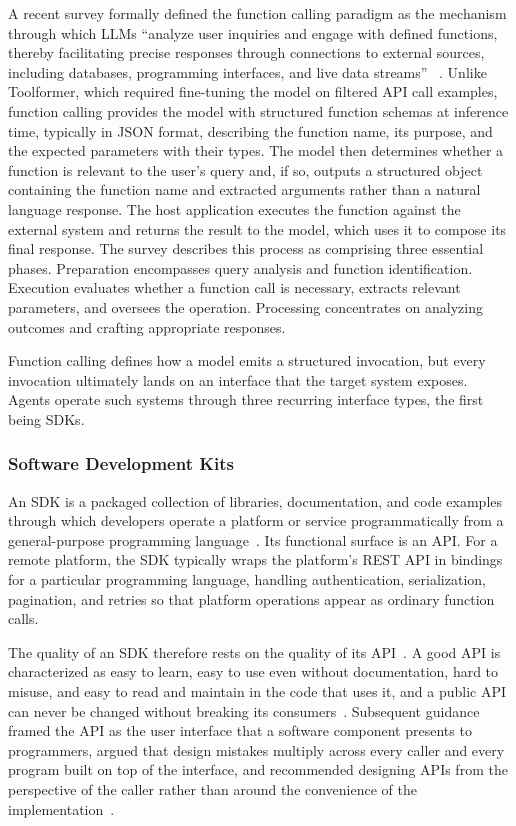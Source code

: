 \documentclass[
english,                 %
bibtex,                  %
]{kththesis}
\numberwithin{listing}{chapter}
\begin{document}
A recent survey formally defined the function calling paradigm as the mechanism through which \glspl{LLM} ``analyze user inquiries and engage with defined functions, thereby facilitating precise responses through connections to external sources, including databases, programming interfaces, and live data streams'' ~\cite{wang_function_2026}. Unlike Toolformer, which required fine-tuning the model on filtered \gls{API} call examples, function calling provides the model with structured function schemas at inference time, typically in \gls{JSON} format, describing the function name, its purpose, and the expected parameters with their types. The model then determines whether a function is relevant to the user's query and, if so, outputs a structured object containing the function name and extracted arguments rather than a natural language response. The host application executes the function against the external system and returns the result to the model, which uses it to compose its final response. The survey describes this process as comprising three essential phases. Preparation encompasses query analysis and function identification. Execution evaluates whether a function call is necessary, extracts relevant parameters, and oversees the operation. Processing concentrates on analyzing outcomes and crafting appropriate responses.

Function calling defines how a model emits a structured invocation, but every invocation ultimately lands on an interface that the target system exposes. Agents operate such systems through three recurring interface types, the first being \glspl{SDK}.

\subsubsection{Software Development Kits}
\label{sec:bg_software_development_kit}

An \gls{SDK} is a packaged collection of libraries, documentation, and code examples through which developers operate a platform or service programmatically from a general-purpose programming language~\cite{bloch_how_2006}. Its functional surface is an \gls{API}. For a remote platform, the \gls{SDK} typically wraps the platform's \gls{REST} \gls{API} in bindings for a particular programming language, handling authentication, serialization, pagination, and retries so that platform operations appear as ordinary function calls.

The quality of an \gls{SDK} therefore rests on the quality of its \gls{API}~\cite{bloch_how_2006}. A good \gls{API} is characterized as easy to learn, easy to use even without documentation, hard to misuse, and easy to read and maintain in the code that uses it, and a public \gls{API} can never be changed without breaking its consumers~\cite{bloch_how_2006}. Subsequent guidance framed the \gls{API} as the user interface that a software component presents to programmers, argued that design mistakes multiply across every caller and every program built on top of the interface, and recommended designing \glspl{API} from the perspective of the caller rather than around the convenience of the implementation~\cite{henning_api_2009}.
\end{document}
